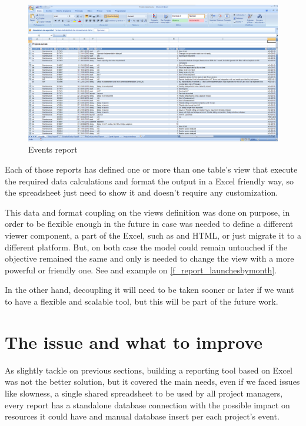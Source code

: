 \begin{figure}[ht!]
	\centering
   	\includegraphics[width=1\textwidth]{./resources/report_events.png}
   	\caption{Events report}
   	\label{f_report_events}
\end{figure}

Each of those reports has defined one or more than one table's view that execute
the required data calculations and format the output in a Excel friendly way, so
the spreadsheet just need to show it and doesn't require any customization. 

This data and format coupling on the views definition was done on purpose,
in order to be flexible enough in the future in case was needed to define a
different viewer component, a part of the Excel, such as and HTML, or just
migrate it to a different platform. But, on both case the model could remain
untouched if the objective remained the same and only is needed to change the
view with a more powerful or friendly one. See and example on
\ref{f_report_launchesbymonth}.



In the other hand, decoupling it will need to be taken sooner or later if
we want to have a flexible and scalable tool, but this will be part of the
future work.

\section{The issue and what to improve}
As slightly tackle on previous sections, building a reporting tool based on
Excel was not the better solution, but it covered the main needs, even if we
faced issues like slowness, a single shared spreadsheet to be used by all
project managers, every report has a standalone database connection with the
possible impact on resources it could have and manual database insert per
each project's event.

